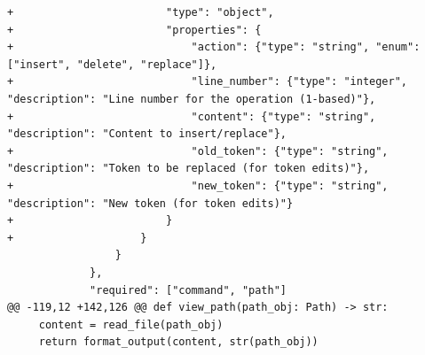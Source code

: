 \documentclass{article} %
\begin{document}
\begin{lstlisting}[style=diffstyle]
+                        "type": "object",
+                        "properties": {
+                            "action": {"type": "string", "enum": ["insert", "delete", "replace"]},
+                            "line_number": {"type": "integer", "description": "Line number for the operation (1-based)"},
+                            "content": {"type": "string", "description": "Content to insert/replace"},
+                            "old_token": {"type": "string", "description": "Token to be replaced (for token edits)"},
+                            "new_token": {"type": "string", "description": "New token (for token edits)"}
+                        }
+                    }
                 }
             },
             "required": ["command", "path"]
@@ -119,12 +142,126 @@ def view_path(path_obj: Path) -> str:
     content = read_file(path_obj)
     return format_output(content, str(path_obj))
 

\end{lstlisting}
\end{document}
